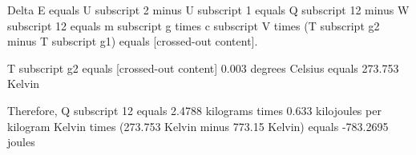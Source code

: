Delta E equals U subscript 2 minus U subscript 1 equals Q subscript 12 minus W subscript 12 equals m subscript g times c subscript V times (T subscript g2 minus T subscript g1) equals [crossed-out content].  

T subscript g2 equals [crossed-out content]  
0.003 degrees Celsius equals 273.753 Kelvin  

Therefore, Q subscript 12 equals 2.4788 kilograms times 0.633 kilojoules per kilogram Kelvin times (273.753 Kelvin minus 773.15 Kelvin) equals -783.2695 joules